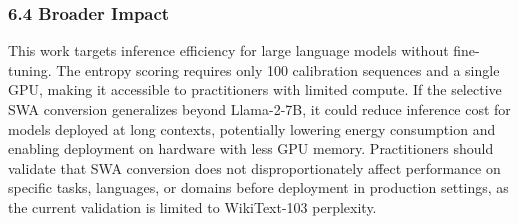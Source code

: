 \subsubsection{6.4 Broader Impact}

This work targets inference efficiency for large language models without fine-tuning. The entropy scoring requires only 100 calibration sequences and a single GPU, making it accessible to practitioners with limited compute. If the selective SWA conversion generalizes beyond Llama-2-7B, it could reduce inference cost for models deployed at long contexts, potentially lowering energy consumption and enabling deployment on hardware with less GPU memory. Practitioners should validate that SWA conversion does not disproportionately affect performance on specific tasks, languages, or domains before deployment in production settings, as the current validation is limited to WikiText-103 perplexity.

